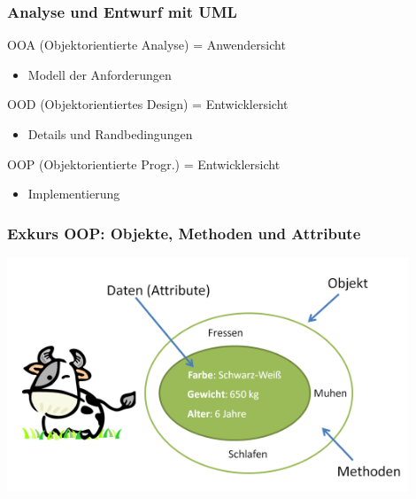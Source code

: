 \begin{frame}
\frametitle{Analyse und Entwurf mit UML}
	OOA (Objektorientierte Analyse) = Anwendersicht
	\begin{itemize}
		\item Modell der Anforderungen
	\end{itemize}
	\bigskip
	OOD (Objektorientiertes Design) = Entwicklersicht
	\begin{itemize}
	 \item Details und Randbedingungen
	\end{itemize}
  \bigskip
	OOP (Objektorientierte Progr.) = Entwicklersicht
	\begin{itemize}
		\item Implementierung
	\end{itemize}
\end{frame}

\begin{frame}
\frametitle{Exkurs OOP: Objekte, Methoden und Attribute}
	\center
	\includegraphics[width=0.9\textwidth, keepaspectratio=true]{bilder/kuh.png}
\end{frame}

